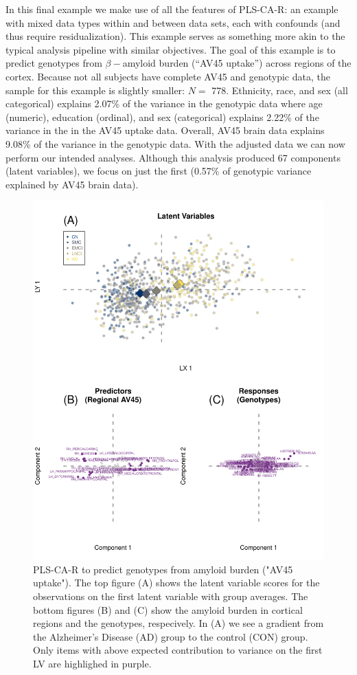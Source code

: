 \documentclass[12pt]{article}
\begin{document}
In this final example we make use of all the features of PLS-CA-R: an
example with mixed data types within and between data sets, each with
confounds (and thus require residualization). This example serves as
something more akin to the typical analysis pipeline with similar
objectives. The goal of this example is to predict genotypes from
\(\beta-\)amyloid burden (``AV45 uptake'') across regions of the cortex.
Because not all subjects have complete AV45 and genotypic data, the
sample for this example is slightly smaller: \(N=\) 778. Ethnicity,
race, and sex (all categorical) explains 2.07\% of the variance in the
genotypic data where age (numeric), education (ordinal), and sex
(categorical) explains 2.22\% of the variance in the in the AV45 uptake
data. Overall, AV45 brain data explains 9.08\% of the variance in the
genotypic data. With the adjusted data we can now perform our intended
analyses. Although this analysis produced 67 components (latent
variables), we focus on just the first (0.57\% of genotypic variance
explained by AV45 brain data).

\begin{figure}[!hbtp]

{\centering \includegraphics[width=.8\textwidth,height=.8\textheight]{PLSCAR_to_a_GPLS_files/figure-latex/unnamed-chunk-13-1} 

}

\caption{\label{fig:brain_genotypes_ex2} PLS-CA-R to predict genotypes from amyloid burden ("AV45 uptake"). The top figure (A) shows the latent variable scores for the observations on the first latent variable with group averages. The bottom figures (B) and (C) show the amyloid burden in cortical regions and the genotypes, respecively. In (A) we see a gradient from the Alzheimer's Disease (AD) group to the control (CON) group. Only items with above expected contribution to variance on the first LV are highlighed in purple.}\label{fig:unnamed-chunk-13}
\end{figure}
\end{document}

